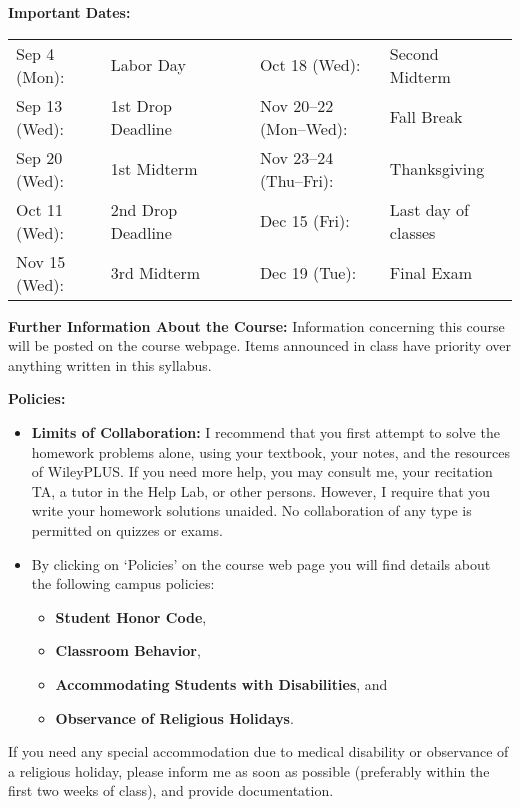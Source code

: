\documentclass[12pt]{amsart}
\begin{document}
\medskip

\noindent
{\bf Important Dates:}

\begin{tabular}{llllll}
Sep 4 (Mon): & Labor Day &&&
   Oct 18 (Wed): & Second Midterm\\
Sep 13 (Wed): & 1st Drop Deadline &&& 
   Nov 20--22 (Mon--Wed): & Fall Break\\
Sep 20 (Wed): & 1st Midterm &&&
   Nov 23--24 (Thu--Fri): & Thanksgiving\\
Oct 11 (Wed): & 2nd Drop Deadline &&&
   Dec 15 (Fri): & Last day of classes\\
Nov 15 (Wed): & 3rd Midterm &&&
   Dec 19 (Tue): & Final Exam
\end{tabular}

\medskip

\noindent
{\bf Further Information About the Course:}
Information concerning this course will be posted on the course webpage.  Items announced in class have priority over anything written in this syllabus.

\medskip

\noindent
{\bf Policies:}
\begin{itemize}
\item
{\bf Limits of Collaboration:}
I recommend that you first attempt to solve the homework problems alone, 
using your textbook, your notes, and the resources of WileyPLUS.
If you need more help, you may consult me, your
recitation TA, a tutor in the Help Lab, or other persons. 
However, I require that you write your homework solutions unaided.  No collaboration of any type is permitted on quizzes or exams. 

\medskip
\item
By clicking on `Policies' on the course web page
you will find details about the following campus policies:
\begin{itemize}
\item 
{\bf Student Honor Code},
\item
{\bf Classroom Behavior}, 
\item
{\bf Accommodating Students with Disabilities}, and 
\item 
{\bf Observance of Religious Holidays}. 
\end{itemize}

\end{itemize}
If you need any special accommodation due to
medical disability or observance of a religious
holiday, please inform me as soon as possible
(preferably within the first two weeks of class),
and provide documentation. 
\end{document}
